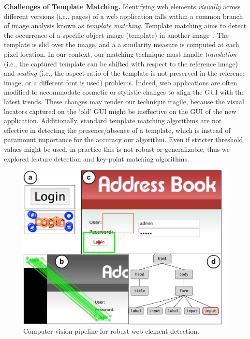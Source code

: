 \noindent
\textbf{Challenges of Template Matching.}
Identifying web elements \textit{visually} across different versions (i.e., pages) of a web application falls within a common branch of image analysis known as \textit{template matching}. 
%
Template matching aims to detect the occurrence of a specific object image (template) in another image~\cite{Brunelli:2009:TMT:1643435}. The template is slid over the image, and a a similarity measure is computed at each pixel location.
%
In our context, our matching technique must handle \textit{translation} (i.e., the captured template can be shifted with respect to the reference image) and \textit{scaling} (i.e., the aspect ratio of the template is not preserved in the reference image, or a different font is used) problems. Indeed, web applications are often modified to accommodate cosmetic or stylistic changes to align the GUI with the latest trends. These changes may render our technique fragile, because the visual locators captured on the `old' GUI might be ineffective on the GUI of the new application. Additionally, standard template matching algorithms are not effective in detecting the presence/absence of a template, which is instead of paramount importance for the accuracy our algorithm.
Even if stricter threshold values might be used, in practice this is not robust or generalizable, thus we explored feature detection and key-point matching algorithms.

\begin{figure}[t]
\centering
\includegraphics[trim={0cm 0cm 0cm 0cm},clip,scale=0.18]{images/cv}
\caption{Computer vision pipeline for robust web element detection.}
\label{fig:cv}
\end{figure}

